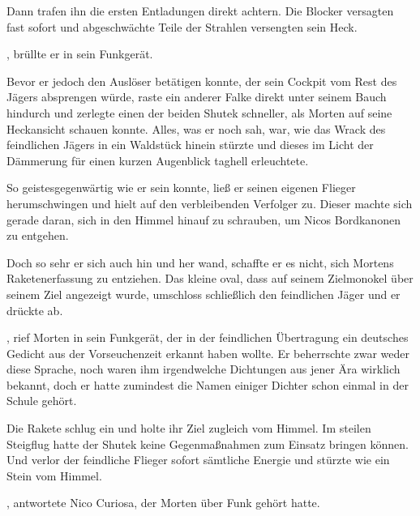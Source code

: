 Dann trafen ihn die ersten Entladungen direkt achtern. Die Blocker versagten fast sofort und abgeschwächte Teile der Strahlen versengten sein Heck.

\par

, brüllte er in sein Funkgerät. 

\par

Bevor er jedoch den Auslöser betätigen konnte, der sein Cockpit vom Rest des Jägers absprengen würde, raste ein anderer Falke direkt unter seinem Bauch hindurch und zerlegte einen der beiden Shutek schneller, als Morten auf seine Heckansicht schauen konnte. Alles, was er noch sah, war, wie das Wrack des feindlichen Jägers in ein Waldstück hinein stürzte und dieses im Licht der Dämmerung für einen kurzen Augenblick taghell erleuchtete.

\par

So geistesgegenwärtig wie er sein konnte, ließ er seinen eigenen Flieger herumschwingen und hielt auf den verbleibenden Verfolger zu. Dieser machte sich gerade daran, sich in den Himmel hinauf zu schrauben, um Nicos Bordkanonen zu entgehen.

\par

Doch so sehr er sich auch hin und her wand, schaffte er es nicht, sich Mortens Raketenerfassung zu entziehen. Das kleine oval, dass auf seinem Zielmonokel über seinem Ziel angezeigt wurde, umschloss schließlich den feindlichen Jäger und er drückte ab.

\par

, rief Morten in sein Funkgerät, der in der feindlichen Übertragung ein deutsches Gedicht aus der Vorseuchenzeit erkannt haben wollte. Er beherrschte zwar weder diese Sprache, noch waren ihm irgendwelche Dichtungen aus jener Ära wirklich bekannt, doch er hatte zumindest die Namen einiger Dichter schon einmal in der Schule gehört.

\par

Die Rakete schlug ein und holte ihr Ziel zugleich vom Himmel. Im steilen Steigflug hatte der Shutek keine Gegenmaßnahmen zum Einsatz bringen können. Und verlor der feindliche Flieger sofort sämtliche Energie und stürzte wie ein Stein vom Himmel.

\par

, antwortete Nico Curiosa, der Morten über Funk gehört hatte. 
